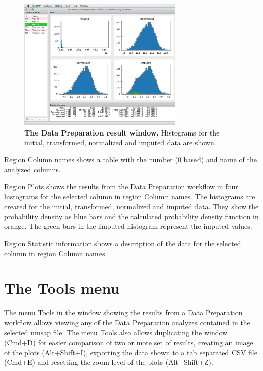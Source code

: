 \begin{figure}[h]
    \centering
    \includegraphics[width=0.7\textwidth]{./IMAGES/DATAPREP/DataPrepRes.jpg}
    \caption[The Data Preparation result window]{\textbf{The Data Preparation
    result window.} Histograms for the initial, transformed, normalized and
    imputed data are shown. }
    \label{fig:dataPrepRes}
    \vspace{-5pt} 	
\end{figure} 

Region Column names shows a table with the number (\num{0} based) and name of the
analyzed columns. 

Region Plots shows the results from the Data Preparation workflow in four histograms
for the selected column in region Column names. The histograms are created for the
initial, transformed, normalized and imputed data. They show the probability density
as blue bars and the calculated probability density function in orange. The green bars
in the Imputed histogram represent the imputed values.

Region Statistic information shows a description of the data for the selected column
in region Column names.

\section{The Tools menu}

The menu Tools in the window showing the results from a Data Preparation workflow
allows viewing any of the Data Preparation analyzes contained in the selected
umsap file. The menu Tools also allows duplicating the window (Cmd+D) for easier
comparison of two or more set of results, creating an image of the plots (Alt+Shift+I),
exporting the data shown to a tab separated CSV file (Cmd+E) and resetting the zoom
level of the plots (Alt+Shift+Z).